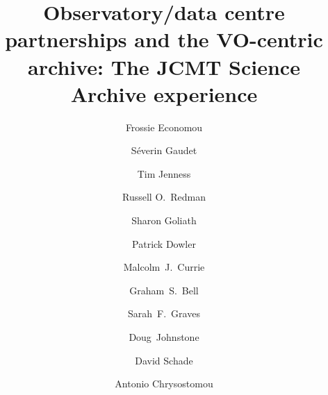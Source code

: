 \documentclass[final,authoryear,5p,times,twocolumn]{elsarticle}
\begin{document}
\begin{frontmatter}



\title{Observatory/data centre partnerships and the VO-centric archive:
  The JCMT Science Archive experience}


\author[lsst]{Frossie Economou}
\author[cadc]{S\'{e}verin Gaudet}
\author[cornell,jac]{Tim Jenness}
\author[jac]{Russell O.\ Redman}
\author[cadc]{Sharon Goliath}
\author[cadc]{Patrick Dowler}
\author[jac]{Malcolm~J.~Currie}
\author[jac]{Graham~S.~Bell}
\author[jac]{Sarah~F.~Graves}
\author[jac,nrc,uvic]{Doug~Johnstone}
\author[cadc]{David Schade}
\author[uherts,jac]{Antonio Chrysostomou}



\address[lsst]{LSST Project Office, 933 N.\ Cherry Ave, Tucson, AZ 85721, USA}
\address[cadc]{Canadian Astronomy Data Centre, National Research Council of Canada, 5071 West Saanich Road., Victoria, BC V9E 2E7, Canada}
\address[cornell]{Department of Astronomy, Cornell University, Ithaca,
  NY 14853, USA}
\address[jac]{Joint Astronomy Centre, 660 N.\ A`oh\=ok\=u Place, Hilo, HI
  96720, USA}
\address[nrc]{NRC-Herzberg Institute of Astrophysics, 5071 West Saanich Road,
Victoria, BC V9E~2E7, Canada}
\address[uvic]{ Department of Physics and Astronomy, University of Victoria, PO Box 3055 STN CSC, Victoria, BC V8W~3P6, Canada}
\address[uherts]{Centre for Astrophysics Research, University of Hertfordshire, College Lane, Hatfield, Hertfordshire AL10 9AB, UK}


\end{frontmatter}
\end{document}
